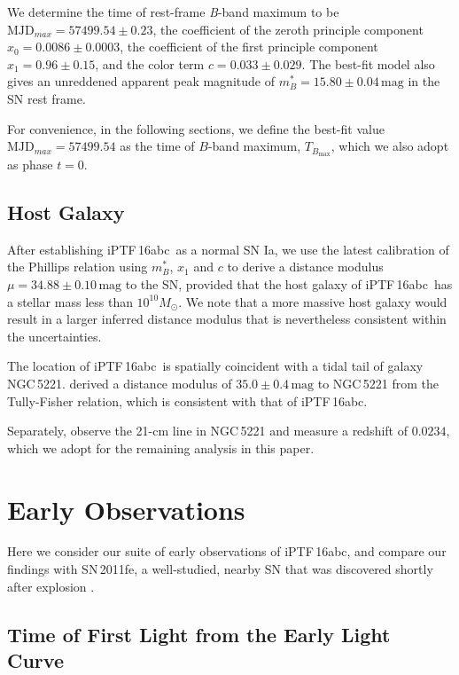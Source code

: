 \documentclass[twocolumn]{aastex61}
\newcommand{\sm}{M_\odot}
\newcommand{\abc}{iPTF\,16abc}
\begin{document}
We determine the time of rest-frame \textit{B}-band maximum to be 
 $\textrm{MJD}_{max}=57499.54\pm0.23$, the coefficient
of the zeroth principle component $x_0 = 0.0086 \pm 0.0003$, the
coefficient of the first principle component $x_1 = 0.96 \pm 0.15$, 
and the color term $c = 0.033 \pm 0.029$. The best-fit model also 
gives an unreddened apparent peak magnitude of $m^*_{B}=15.80 \pm 
0.04 \,\textrm{mag}$ in the SN rest frame.

For convenience, in the following sections, we define the best-fit
value $\textrm{MJD}_{max}=57499.54$ as the time of $B$-band maximum, $T_{B_\mathrm{max}}$, which we also adopt as phase $t=0$.

\subsection{Host Galaxy}
\label{sec:host}

After establishing \abc\ as a normal SN Ia, we use the latest
calibration \citep{2014A&A...568A..22B} of the Phillips relation
\citep{1993ApJ...413L.105P} using $m^*_{B}$, $x_1$ and $c$ to derive 
a distance modulus $\mu = 34.88 \pm 0.10 \,\textrm{mag}$ to the SN, 
provided that the host galaxy of \abc\ has a stellar mass less than
$10^{10}\sm$. We note that a more massive host galaxy would result 
in a larger inferred distance modulus that is nevertheless 
consistent within the uncertainties.

The location of \abc\ is spatially coincident with a tidal tail of
galaxy NGC\,5221. \citet{2007A&A...465...71T} derived a distance
modulus of $35.0\pm0.4\,\textrm{mag}$ to NGC\,5221 from the 
Tully-Fisher relation, which is consistent with that of \abc.

Separately, \citet{2015MNRAS.447.1531C} observe the 21-cm line in
NGC\,5221 and measure a redshift of $0.0234$, which we adopt for the remaining analysis in this paper.

\section{Early Observations}
\label{sec:first_light}

Here we consider our suite of early observations of \abc, and compare our findings with SN\,2011fe, a well-studied, nearby SN that was discovered shortly after explosion \citep{2011Natur.480..344N,2012ApJ...744L..17B,2014ApJ...784...85P}. 

\subsection{Time of First Light from the Early Light Curve}
\label{sec:lc_fit}
\end{document}
